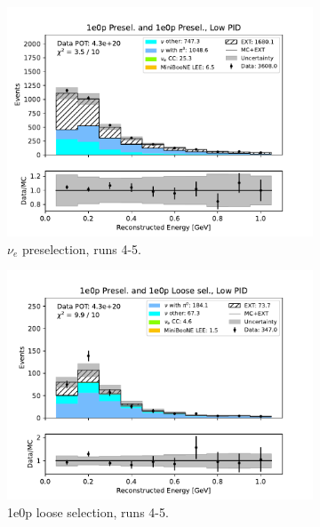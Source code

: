 \begin{figure}[H]
\begin{subfigure}{0.5\linewidth}
        \includegraphics[width=\linewidth]{technote/Sidebands/Figures/FarSideband/far_sideband_reco_e_run4b4c4d5_ZP_ZP_LOW_PID.pdf}
        \caption{$\nu_e$ preselection, runs 4-5.}
    \end{subfigure}%
    \begin{subfigure}{0.5\linewidth}
        \includegraphics[width=\linewidth]{technote/Sidebands/Figures/FarSideband/far_sideband_reco_e_run4b4c4d5_ZP_ZPLOOSESEL_LOW_PID.pdf}
        \caption{1e0p loose selection, runs 4-5.}
    \end{subfigure}    
    \begin{subfigure}{0.5\linewidth}

\end{subfigure}
\end{figure}
